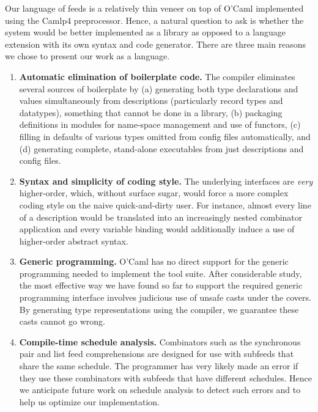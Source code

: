 Our language of feeds is a relatively thin veneer on top of O'Caml
implemented using the Camlp4 preprocessor.  
Hence, a natural question to ask is whether the system would be better
implemented as a library as opposed to a language extension with its
own syntax and code generator.  There are three main reasons we chose
to present our work as a language.
\begin{enumerate}
\item {\bf Automatic elimination of boilerplate code.} 
The compiler eliminates several sources of boilerplate by
(a) generating both type declarations and values simultaneously from 
descriptions (particularly record types and datatypes), something
that cannot be done in a library, (b) packaging definitions
in modules for name-space management and use of functors, 
(c) filling in defaults of various types omitted from config 
files automatically, and (d) generating complete, stand-alone 
executables from just descriptions and config files.
\item {\bf Syntax and simplicity of coding style.}  The underlying
interfaces are {\em very} higher-order, which, without surface sugar,
would force a more complex coding style on the naive quick-and-dirty user.
For instance, almost every line of a description would be translated
into an increasingly nested combinator application and every variable binding
would additionally induce a use of higher-order abstract syntax. 
\item {\bf Generic programming.} O'Caml has no direct support for
the generic programming needed to implement the tool suite.  After considerable
study, the most effective way we have found so far to support the required 
generic programming interface involves judicious use of unsafe casts
under the covers.  By generating type representations using the compiler,
we guarantee these casts cannot go wrong.
\item {\bf Compile-time schedule analysis.} Combinators such as the synchronous
pair and list feed comprehensions are designed for use with subfeeds that
share the same schedule.  The programmer has very likely made an error
if they use these combinators with subfeeds that have different schedules.
Hence we anticipate future work on schedule analysis to detect such errors
and to help us optimize our implementation. 
\end{enumerate}
